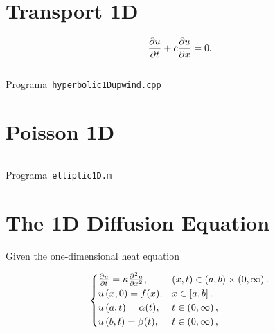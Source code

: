 \documentclass[a4paper,abstract=true]{scrreprt}
\begin{document}
\section{Transport 1D}

\begin{equation*}
	\diffp{u}{t}+c\diffp{u}{x}=
	0.
\end{equation*}

\begin{listing}[ht!]
	\tiny
	\centering
	\inputminted[frame=single,framesep=10pt,linenos,firstline=9,lastline=35,highlightlines={9}]{cpp}{../examples/cpp/hyperbolic1D_upwind.cpp}
	\caption{Programa~\texttt{hyperbolic1Dupwind.cpp}}
	\label{code:hyperbolic1Dupwind.cpp}
\end{listing}

\section{Poisson 1D}

\begin{listing}[ht!]
	\tiny
	\centering
	\inputminted[frame=single,framesep=10pt,linenos,firstline=1,lastline=53,highlightlines={21,29}]{octave}{../examples/octave/elliptic1D.m}
	\caption{Programa~\texttt{elliptic1D.m}}
	\label{code:elliptic1D.m}
\end{listing}

\section{The 1D Diffusion Equation}

Given the one-dimensional heat equation

\begin{equation}\label{eq:IBVPheat1d}
	\begin{cases}
		\diffp{u}{t}=
		\kappa\diffp[2]{u}{x},
		                              & \left(x,t\right)\in
		\left(a,b \right)\times\left(0, \infty \right).     \\
		u\left(x,0\right)=f(x),
		                              & x\in
		\left[a,b\right].                                   \\
		u\left(a,t\right)= \alpha(t), & t\in
		\left(0,\infty\right),                              \\
		u\left(b,t\right)= \beta(t),
		                              & t\in
		\left(0,\infty\right),
	\end{cases}
\end{equation}
\end{document}
